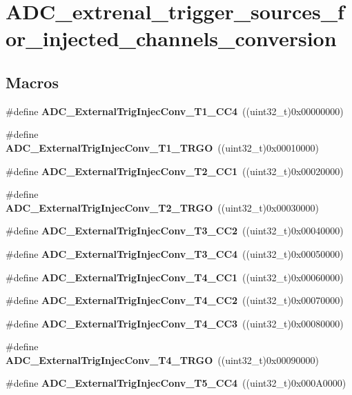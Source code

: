 \section{A\+D\+C\+\_\+extrenal\+\_\+trigger\+\_\+sources\+\_\+for\+\_\+injected\+\_\+channels\+\_\+conversion}
\label{group__ADC__extrenal__trigger__sources__for__injected__channels__conversion}
\subsection*{Macros}
\begin{DoxyCompactItemize}
\item 
\#define \textbf{ A\+D\+C\+\_\+\+External\+Trig\+Injec\+Conv\+\_\+\+T1\+\_\+\+C\+C4}~((uint32\+\_\+t)0x00000000)
\item 
\#define \textbf{ A\+D\+C\+\_\+\+External\+Trig\+Injec\+Conv\+\_\+\+T1\+\_\+\+T\+R\+GO}~((uint32\+\_\+t)0x00010000)
\item 
\#define \textbf{ A\+D\+C\+\_\+\+External\+Trig\+Injec\+Conv\+\_\+\+T2\+\_\+\+C\+C1}~((uint32\+\_\+t)0x00020000)
\item 
\#define \textbf{ A\+D\+C\+\_\+\+External\+Trig\+Injec\+Conv\+\_\+\+T2\+\_\+\+T\+R\+GO}~((uint32\+\_\+t)0x00030000)
\item 
\#define \textbf{ A\+D\+C\+\_\+\+External\+Trig\+Injec\+Conv\+\_\+\+T3\+\_\+\+C\+C2}~((uint32\+\_\+t)0x00040000)
\item 
\#define \textbf{ A\+D\+C\+\_\+\+External\+Trig\+Injec\+Conv\+\_\+\+T3\+\_\+\+C\+C4}~((uint32\+\_\+t)0x00050000)
\item 
\#define \textbf{ A\+D\+C\+\_\+\+External\+Trig\+Injec\+Conv\+\_\+\+T4\+\_\+\+C\+C1}~((uint32\+\_\+t)0x00060000)
\item 
\#define \textbf{ A\+D\+C\+\_\+\+External\+Trig\+Injec\+Conv\+\_\+\+T4\+\_\+\+C\+C2}~((uint32\+\_\+t)0x00070000)
\item 
\#define \textbf{ A\+D\+C\+\_\+\+External\+Trig\+Injec\+Conv\+\_\+\+T4\+\_\+\+C\+C3}~((uint32\+\_\+t)0x00080000)
\item 
\#define \textbf{ A\+D\+C\+\_\+\+External\+Trig\+Injec\+Conv\+\_\+\+T4\+\_\+\+T\+R\+GO}~((uint32\+\_\+t)0x00090000)
\item 
\#define \textbf{ A\+D\+C\+\_\+\+External\+Trig\+Injec\+Conv\+\_\+\+T5\+\_\+\+C\+C4}~((uint32\+\_\+t)0x000\+A0000)
\item 

\end{DoxyCompactItemize}
